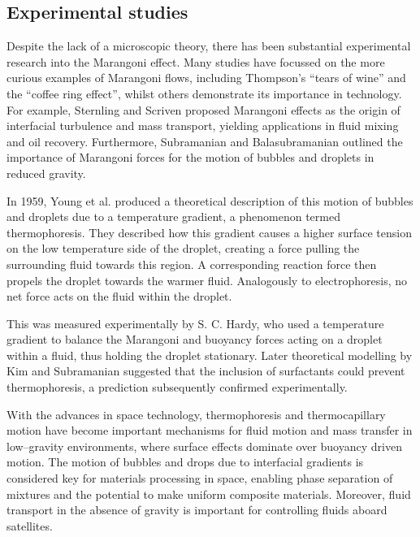 \subsection{Experimental studies}
Despite the lack of a microscopic theory, there has been substantial experimental research into the Marangoni effect.
Many studies have focussed on the more curious examples of Marangoni flows, including Thompson's ``tears of wine''\cite{JThompson,Venerus,Tadmor,Cazabat1995} and the ``coffee ring effect'',\cite{Sefian,HuLarson,Sefiane2014} whilst others demonstrate its importance in technology.
For example, Sternling and Scriven\cite{SternlingScriven} proposed Marangoni effects as the origin of interfacial turbulence and mass transport, yielding applications in fluid mixing and oil recovery.\cite{Aguilera2005,LyfordA,LyfordB} 
Furthermore, Subramanian and Balasubramanian outlined the importance of Marangoni forces for the motion of bubbles and droplets in reduced gravity.\cite{MotionOfBubblesAndDrops} 

In 1959, Young et al. produced a theoretical description of this motion of bubbles and droplets due to a temperature gradient, a phenomenon termed thermophoresis.\cite{Young1959}
They described how this gradient causes a higher surface tension on the low temperature side of the droplet, creating a force pulling the surrounding fluid towards this region.
A corresponding reaction force then propels the droplet towards the warmer fluid.
Analogously to electrophoresis, no net force acts on the fluid within the droplet.

This was measured experimentally by S. C. Hardy,\cite{Hardy1978} who used a temperature gradient to balance the Marangoni and buoyancy forces acting on a droplet within a fluid, thus holding the droplet stationary.
Later theoretical modelling by Kim and Subramanian suggested that the inclusion of surfactants could prevent thermophoresis,\cite{KimSubramanianA,KimSubramanianB} a prediction subsequently confirmed experimentally.\cite{BartonSubramanian,ChenStebe}

With the advances in space technology, thermophoresis and thermocapillary motion have become important mechanisms for fluid motion and mass transfer in low--gravity environments, where surface effects dominate over buoyancy driven motion.
The motion of bubbles and drops due to interfacial gradients is considered key for materials processing in space, enabling phase separation of mixtures and the potential to make uniform composite materials.\cite{BartonSubramanian}
Moreover, fluid transport in the absence of gravity is important for controlling fluids aboard satellites. 

